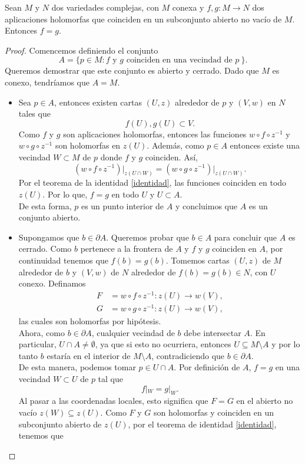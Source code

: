 \begin{theorem}\label{teoidentidad}
	Sean $M$ y $N$ dos variedades complejas, con $M$ conexa y $f,g:M\to N$ dos aplicaciones holomorfas que coinciden en un subconjunto abierto no vacío de $M$. Entonces $f=g$. 
\end{theorem}
\begin{proof}
	Comencemos definiendo el conjunto
	\begin{equation*}
		A=\{p\in M:f\text{ y }g\text{ coinciden en una vecindad de }p\ \}.
	\end{equation*}
	Queremos demostrar que este conjunto es abierto y cerrado. Dado que $M$ es conexo, tendríamos que $A=M$.
	\begin{itemize}
		\item Sea $p\in A$, entonces existen cartas $(U,z)$ alrededor de $p$ y $(V,w)$ en $N$ tales que
		\begin{equation*}
			f(U),g(U)\subset V.
		\end{equation*}
		Como $f$ y $g$ son aplicaciones holomorfas, entonces las funciones $w\circ f\circ z^{-1}$ y $w\circ g\circ z^{-1}$ son holomorfas en $z(U)$. Además, como $p\in A$ entonces existe una vecindad $W\subset M$ de $p$ donde $f$ y $g$ coinciden. Así,
		\begin{equation*}
			(w\circ f\circ z^{-1})\left.\right|_{z(U\cap W)}=(w\circ g\circ z^{-1})\left.\right|_{z(U\cap W)}.
		\end{equation*} 
		Por el teorema de la identidad \ref{identidad}, las funciones coinciden en todo $z(U)$.
		Por lo que, $f=g$ en todo $U$ y $U\subset A$.\\
		De esta forma, $p$ es un punto interior de $A$ y concluimos que $A$ es un conjunto abierto.
		
		\item Supongamos que $b\in \partial A$. Queremos probar que $b\in A$ para concluir que $A$ es cerrado.
		Como $b$ pertenece a la frontera de $A$ y $f$ y $g$ coinciden en $A$, por continuidad tenemos que $f(b)=g(b)$. Tomemos cartas $(U,z)$ de $M$ alrededor de $b$ y $(V,w)$ de $N$ alrededor de $f(b)=g(b)\in N$, con $U$ conexo. Definamos
		\begin{align*}
			F&=w\circ f\circ z^{-1}:z(U)\to w(V),\\
			G&=w\circ g\circ z^{-1}:z(U)\to w(V),
		\end{align*}
		las cuales son holomorfas por hipótesis.\\
		Ahora, como $b\in\partial A$, cualquier vecindad de $b$ debe intersectar $A$. En particular, $U\cap A\neq\emptyset$, ya que si esto no ocurriera, entonces $U\subseteq M\setminus A$ y por lo tanto $b$ estaría en el interior de $M\setminus A$, contradiciendo que $b\in\partial A$.\\
		De esta manera, podemos tomar $p\in U\cap A$. Por definición de $A$, $f=g$ en una vecindad $W\subset U$ de $p$ tal que
		$$
		f|_W = g|_W.
		$$
		Al pasar a las coordenadas locales,
		esto significa que $F=G$ en el abierto no vacío $z(W)\subseteq z(U)$. Como $F$ y $G$ son holomorfas y coinciden en un subconjunto abierto de $z(U)$, por el teorema de identidad \ref{identidad}, tenemos que
		

\end{itemize}
\end{proof}
